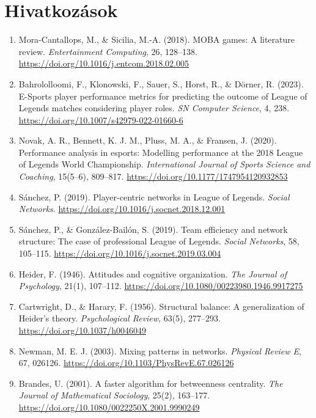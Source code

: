 \documentclass[12pt,a4paper]{article}
\begin{document}
\section{Hivatkozások}

\begin{enumerate}
  \item Mora-Cantallops, M., \& Sicilia, M.-A. (2018). MOBA games: A literature review. \textit{Entertainment Computing}, 26, 128--138. \url{https://doi.org/10.1016/j.entcom.2018.02.005}
  \item Bahrololloomi, F., Klonowski, F., Sauer, S., Horst, R., \& Dörner, R. (2023). E-Sports player performance metrics for predicting the outcome of League of Legends matches considering player roles. \textit{SN Computer Science}, 4, 238. \url{https://doi.org/10.1007/s42979-022-01660-6}
  \item Novak, A. R., Bennett, K. J. M., Pluss, M. A., \& Fransen, J. (2020). Performance analysis in esports: Modelling performance at the 2018 League of Legends World Championship. \textit{International Journal of Sports Science and Coaching}, 15(5--6), 809--817. \url{https://doi.org/10.1177/1747954120932853}
  \item Sánchez, P. (2019). Player-centric networks in League of Legends. \textit{Social Networks}. \url{https://doi.org/10.1016/j.socnet.2018.12.001}
  \item Sánchez, P., \& González-Bailón, S. (2019). Team efficiency and network structure: The case of professional League of Legends. \textit{Social Networks}, 58, 105--115. \url{https://doi.org/10.1016/j.socnet.2019.03.004}
  \item Heider, F. (1946). Attitudes and cognitive organization. \textit{The Journal of Psychology}, 21(1), 107--112. \url{https://doi.org/10.1080/00223980.1946.9917275}
  \item Cartwright, D., \& Harary, F. (1956). Structural balance: A generalization of Heider's theory. \textit{Psychological Review}, 63(5), 277--293. \url{https://doi.org/10.1037/h0046049}
  \item Newman, M. E. J. (2003). Mixing patterns in networks. \textit{Physical Review E}, 67, 026126. \url{https://doi.org/10.1103/PhysRevE.67.026126}
  \item Brandes, U. (2001). A faster algorithm for betweenness centrality. \textit{The Journal of Mathematical Sociology}, 25(2), 163--177. \url{https://doi.org/10.1080/0022250X.2001.9990249}
\end{enumerate}
\end{document}
